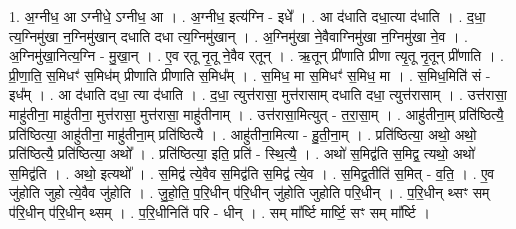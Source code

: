 \documentclass[17pt]{extarticle}
\begin{document}
1. अ॒ग्नीध॒ आ ऽग्नीधे॒ ऽग्नीध॒ आ । . अ॒ग्नीध॒ इत्य॑ग्नि - इधे᳚ । . आ द॑धाति दधा॒त्या द॑धाति । . द॒धा॒ त्य॒ग्निमु॑खा न॒ग्निमु॑खान् दधाति दधा त्य॒ग्निमु॑खान् । . अ॒ग्निमु॑खा ने॒वैवाग्निमु॑खा न॒ग्निमु॑खा ने॒व । . अ॒ग्निमु॑खा॒नित्य॒ग्नि - मु॒खा॒न् । . ए॒व र्‌तू नृ॒तू ने॒वैव र्‌तून् । . ऋ॒तून् प्री॑णाति प्रीणा त्यृ॒तू नृ॒तून् प्री॑णाति । . प्री॒णा॒ति॒ स॒मिधꣳ॑ स॒मिध॑म् प्रीणाति प्रीणाति स॒मिध᳚म् । . स॒मिध॒ मा स॒मिधꣳ॑ स॒मिध॒ मा । . स॒मिध॒मिति॑ सं - इध᳚म् । . आ द॑धाति दधा॒ त्या द॑धाति । . द॒धा॒ त्युत्त॑रासा॒ मुत्त॑रासाम् दधाति दधा॒ त्युत्त॑रासाम् । . उत्त॑रासा॒ माहु॑तीना॒ माहु॑तीना॒ मुत्त॑रासा॒ मुत्त॑रासा॒ माहु॑तीनाम् । . उत्त॑रासा॒मित्युत् - त॒रा॒सा॒म् । . आहु॑तीना॒म् प्रति॑ष्ठित्यै॒ प्रति॑ष्ठित्या॒ आहु॑तीना॒ माहु॑तीना॒म् प्रति॑ष्ठित्यै । . आहु॑तीना॒मित्या - हु॒ती॒ना॒म् । . प्रति॑ष्ठित्या॒ अथो॒ अथो॒ प्रति॑ष्ठित्यै॒ प्रति॑ष्ठित्या॒ अथो᳚ । . प्रति॑ष्ठित्या॒ इति॒ प्रति॑ - स्थि॒त्यै॒ । . अथो॑ स॒मिद्व॑ति स॒मिद्व॒ त्यथो॒ अथो॑ स॒मिद्व॑ति । . अथो॒ इत्यथो᳚ । . स॒मिद्व॑ त्ये॒वैव स॒मिद्व॑ति स॒मिद्व॑ त्ये॒व । . स॒मिद्व॒तीति॑ स॒मित् - व॒ति॒ । . ए॒व जु॑होति जुहो त्ये॒वैव जु॑होति । . जु॒हो॒ति॒ प॒रि॒धीन् प॑रि॒धीन् जु॑होति जुहोति परि॒धीन् । . प॒रि॒धीन् थ्सꣳ सम् प॑रि॒धीन् प॑रि॒धीन् थ्सम् । . प॒रि॒धीनिति॑ परि - धीन् । . सम् मा᳚र्ष्टि मार्ष्टि॒ सꣳ सम् मा᳚र्ष्टि । \newline
\end{document}
